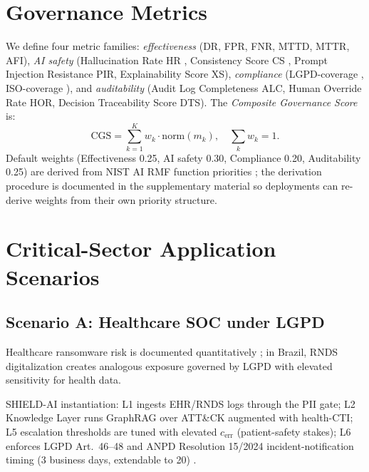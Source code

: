 \documentclass[journal]{IEEEtran}
\begin{document}
\section{Governance Metrics}
\label{sec:metrics}

We define four metric families: \emph{effectiveness} (DR, FPR, FNR, MTTD, MTTR, AFI),
\emph{AI safety} (Hallucination Rate HR \cite{ji2023hallucination}, Consistency Score CS
\cite{manakul2023selfcheckgpt}, Prompt Injection Resistance PIR, Explainability Score XS),
\emph{compliance} (LGPD-coverage \cite{lgpd2018,anpd15}, ISO-coverage \cite{iso27001,iso42001}),
and \emph{auditability} (Audit Log Completeness ALC, Human Override Rate HOR, Decision
Traceability Score DTS). The \emph{Composite Governance Score} is:
\begin{equation}
\text{CGS} = \sum_{k=1}^{K} w_k \cdot \text{norm}(m_k), \quad \sum_k w_k = 1.
\end{equation}
Default weights (Effectiveness 0.25, AI safety 0.30, Compliance 0.20, Auditability 0.25)
are derived from NIST AI RMF function priorities \cite{nist2023airmf,nist2024genai}; the
derivation procedure is documented in the supplementary material so deployments can re-derive
weights from their own priority structure.

\section{Critical-Sector Application Scenarios}
\label{sec:scenarios}

\subsection{Scenario A: Healthcare SOC under LGPD}
Healthcare ransomware risk is documented quantitatively \cite{neprash2022ransomware,
jama2024ransomware,neprash2024changehealthcare}; in Brazil, RNDS digitalization creates
analogous exposure governed by LGPD with elevated sensitivity for health data.

SHIELD-AI instantiation: L1 ingests EHR/RNDS logs through the PII gate; L2 Knowledge Layer
runs GraphRAG over ATT\&CK augmented with health-CTI; L5 escalation thresholds are tuned with
elevated $c_{\text{err}}$ (patient-safety stakes); L6 enforces LGPD Art.~46--48 and ANPD
Resolution 15/2024 incident-notification timing (3 business days, extendable to 20)
\cite{anpd15}.
\end{document}
